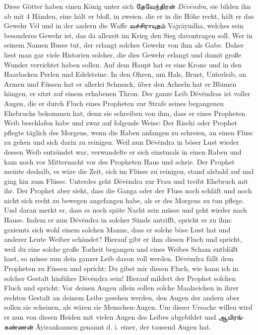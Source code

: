 \documentclass{article}
\newcommand{\TamilText}[1]{\texttamil{#1}}
\newcommand{\tam}[1]{\TamilText{#1}}
\begin{document}
Diese Götter haben einen König unter sich \tam{தேவேந்திரன்} \emph{D\={e}v\={e}ndra}, sie bilden ihn ab mit 4 Händen, eine hält er bloß, in zweien, die er in die Höhe reckt, hält er das Gewehr V\={e}l und in der andern die Waffe \tam{வச்சிராயுதம்} Vajr\={a}yudha, welches sein besonderes Gewehr ist, das da allezeit im Krieg den Sieg davontragen soll. Wer in seinem Namen Busse tut, der erlangt solches Gewehr von ihm als Gabe. Daher liest man gar viele Historien solcher, die dies Gewehr erlangt und damit große Wunder verrichtet haben sollen. Auf dem Haupt hat er eine Krone und in den Haarlocken Perlen und Edelsteine. In den Ohren, um Hals, Brust, Unterleib, an Armen und Füssen hat er allerlei Schmuck, über den Achseln hat er Blumen hängen, er sitzt auf einem erhabenen Thron. Der ganze Leib D\={e}v\={e}ndras ist voller Augen, die er durch Fluch eines Propheten zur Strafe seines begangenen Ehebruchs bekommen hat, denn sie schreiben von ihm, dass er eines Propheten Weib beschlafen habe und zwar auf folgende Weise: Der Rischi oder Prophet pflegte täglich des Morgens, wenn die Raben anfangen zu schreien, an einen Fluss zu gehen und sich darin zu reinigen. Weil nun D\={e}v\={e}ndra in böser Lust wieder dessen Weib entzündet war, verwandelte er sich einstmals in einen Raben und kam noch vor Mitternacht vor des Propheten Haus und schrie. Der Prophet meinte deshalb, es wäre die Zeit, sich im Flüsse zu reinigen, stand alsbald auf und ging hin zum Flüsse. Unterdes geht D\={e}v\={e}ndra zur Frau und treibt Ehebruch mit ihr. Der Prophet aber sieht, dass die Ganga oder der Fluss noch schläft und noch nicht sich recht zu bewegen angefangen habe, als er des Morgens zu tun pflege. Und daran merkt er, dass es noch späte Nacht sein müsse und geht wieder nach Hause. Indem er nun D\={e}v\={e}ndra in solcher Sünde antrifft, spricht er zu ihm: geziemts sich wohl einem solchen Manne, dass er solche böse Lust hat und anderer Leute Weiber schändet? Hierauf gibt er ihm diesen Fluch und spricht, weil du eine solche große Torheit begangen und eines Weibes Scham entblößt hast, so müsse nun dein ganzer Leib davon voll werden. D\={e}v\={e}ndra fällt dem Propheten zu Füssen und spricht: Du gibst mir diesen Fluch, wie kann ich in solcher Gestalt hinführe D\={e}v\={e}ndra sein! Hierauf mildert der Prophet solchen Fluch und spricht: Vor deinen Augen allein sollen solche Maalzeichen in ihrer rechten Gestalt an deinem Leibe gesehen werden, den Augen der andern aber sollen sie scheinen, als wären sie Menschen-Augen. Um dieser Ursache willen wird er nun von diesen Heiden mit vielen Augen des Leibes abgebildet und \tam{ஆயிரங்கண்ணன்} \={A}yirankannen genannt d. i. einer, der tausend Augen hat.
\end{document}
